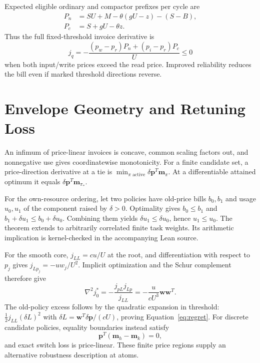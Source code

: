 \documentclass[sigconf,screen,nonacm]{acmart}
\newcommand{\pp}{\boldsymbol{p}}
\newcommand{\Mvec}{\boldsymbol{m}}
\newcommand{\Wvec}{\boldsymbol{w}}
\begin{document}
Expected eligible ordinary and compactor prefixes per cycle are
\begin{align}
P_n&=SU+M-\theta(gU-z)-(S-B),\\
P_c&=S+gU-\theta z.
\end{align}
Thus the full fixed-threshold invoice derivative is
\begin{equation}
j_q=-\frac{(p_w-p_r)P_n+(p_i-p_r)P_c}{U}\le0
\end{equation}
when both input/write prices exceed the read price. Improved reliability
reduces the bill even if marked threshold directions reverse.

\section{Envelope Geometry and Retuning Loss}
\label{app:geometry}

An infimum of price-linear invoices is concave, common scaling factors out,
and nonnegative use gives coordinatewise monotonicity. For a finite candidate
set, a price-direction derivative at a tie is
$\min_{\pi\text{ active}}\delta\pp^T\Mvec_\pi$. At a differentiable attained
optimum it equals $\delta\pp^T\Mvec_{\pi_*}$.

For the own-resource ordering, let two policies have old-price bills $b_0,b_1$
and usage $u_0,u_1$ of the component raised by $\delta>0$. Optimality gives
$b_0\le b_1$ and $b_1+\delta u_1\le b_0+\delta u_0$. Combining them yields
$\delta u_1\le\delta u_0$, hence $u_1\le u_0$. The theorem extends to
arbitrarily correlated finite task weights. Its arithmetic implication is
kernel-checked in the accompanying Lean source.

For the smooth core, $j_{LL}=cu/U$ at the root, and differentiation with
respect to $p_j$ gives $j_{Lp_j}=-uw_j/U^2$. Implicit optimization and the
Schur complement therefore give
\begin{equation}
\nabla^2j_0^*=-\frac{j_{pL}j_{Lp}}{j_{LL}}
 =-\frac{u}{cU^3}\Wvec\Wvec^T.
\end{equation}
The old-policy excess follows by the quadratic expansion in threshold:
$\tfrac12j_{LL}(\delta L)^2$ with
$\delta L=\Wvec^T\delta\pp/(cU)$, proving Equation~\eqref{eq:regret}.
For discrete candidate policies, equality boundaries instead satisfy
\begin{equation}
\pp^T(\Mvec_h-\Mvec_k)=0,
\end{equation}
and exact switch loss is price-linear. These
finite price regions supply an alternative robustness description at atoms.
\end{document}
